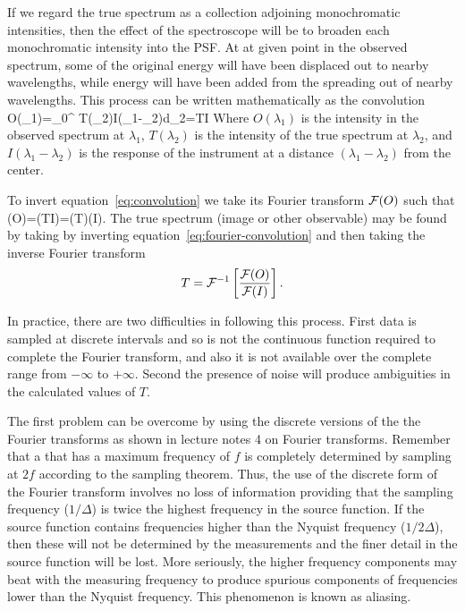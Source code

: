 If we regard the true spectrum as a collection adjoining monochromatic intensities, then the effect of the spectroscope will be to broaden each monochromatic intensity into the PSF. At at given point in the observed spectrum, some of the original energy will have been displaced out to nearby wavelengths, while energy will have been added from the spreading out of nearby wavelengths. This process can be written mathematically as the convolution
\be
O(\lambda_1)=\int_0^{\infty} T(\lambda_2)I(\lambda_1-\lambda_2)d\lambda_2=T\otimes I
\label{eq:convolution}
\ee
Where $O(\lambda_1)$ is the intensity in the observed spectrum at $\lambda_1$, $T(\lambda_2)$ is the intensity of the true spectrum at $\lambda_2$, and $I(\lambda_1-\lambda_2)$ is the response of the instrument at a distance $(\lambda_1-\lambda_2)$ from the center.

To invert equation~\ref{eq:convolution} we take its Fourier transform ${\cal F}(O)$ such that
\be
{}(O)=(T\otimes I)=(T)\times{}(I).
\label{eq:fourier-convolution}
\ee
The true spectrum (image or other observable) may be found by taking by inverting equation~\ref{eq:fourier-convolution} and then taking the inverse Fourier transform
\[
T={\cal F}^{-1}\left[{{\cal F}(O)\over{\cal F}(I)}\right].
\]

In practice, there are two difficulties in following this process. First data is sampled at discrete intervals and so is not the continuous function required to complete the Fourier transform, and also it is not available over the complete range from $-\infty$ to $+\infty$. Second the presence of noise will produce ambiguities in the calculated values of $T$.

The first problem can be overcome by using the discrete versions of the the Fourier transforms as shown in lecture notes 4 on Fourier transforms. Remember that a that has 
a maximum frequency of $f$ is completely determined by sampling at $2f$ according to the sampling theorem. Thus, the use of the discrete form of the Fourier transform involves no loss of information providing that the sampling frequency (${1/\Delta}$) is twice the highest frequency in the source function. If the source function contains frequencies higher than the Nyquist frequency (${1/2\Delta}$), then these will not be determined by the measurements and the finer detail in the source function will be lost. More seriously, the higher frequency components may beat with the measuring frequency to produce spurious components of frequencies lower than the Nyquist frequency. This phenomenon is known as aliasing. 


